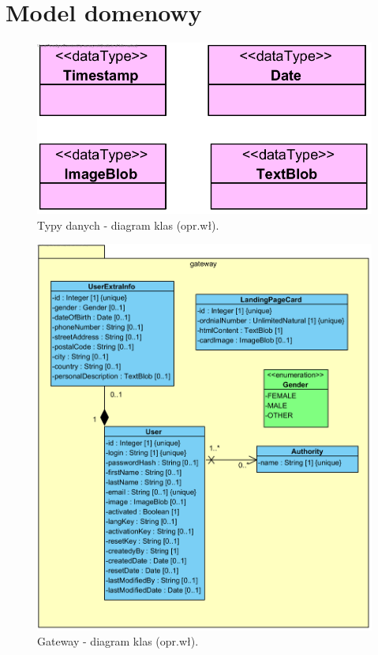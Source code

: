 \section{Model domenowy}

\begin{minipage}{\textwidth}
    \begin{figure}[H]
        \centering\includegraphics[scale=0.7]{../uml/class_diagrams/dataTypes.png}
        \caption{Typy danych - diagram klas (opr.wł).}\label{rysunek:class-diagram-data-types}
    \end{figure}
\end{minipage}

\begin{minipage}{\textwidth}
    \begin{figure}[H]
        \centering\includegraphics[scale=0.7]{../uml/class_diagrams/gateway.png}
        \caption{Gateway - diagram klas (opr.wł).}\label{rysunek:class-diagram-gateway}
    \end{figure}
\end{minipage}

